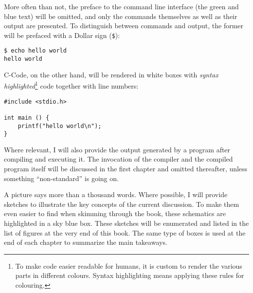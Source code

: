More often than not, the preface to the command line interface (the green and blue text) will be omitted, and only the commands themselves as well as their output are presented. To distinguish between commands and output, the former will be prefaced with a Dollar sign (\texttt{\$}):

\begin{cmdbox}
\texttt{\$ echo hello world} \\
\texttt{hello world}
\end{cmdbox}

C-Code, on the other hand, will be rendered in white boxes with \emph{syntax highlighted}\footnote{To make code easier readable for humans, it is custom to render the various parts in different colours. Syntax highlighting means applying these rules for colouring.} code together with line numbers:
\begin{codebox}[helloworld.c]
\begin{verbatim}
#include <stdio.h>

int main () {
    printf("hello world\n");
}
\end{verbatim}
\end{codebox}

Where relevant, I will also provide the output generated by a program after compiling and executing it. The invocation of the compiler and the compiled program itself will be discussed in the first chapter and omitted thereafter, unless something \enquote{non-standard} is going on.

A picture says more than a thousand words. Where possible, I will provide sketches to illustrate the key concepts of the current discussion. To make them even easier to find when skimming through the book, these schematics are highlighted in a sky blue box. These sketches will be enumerated and listed in the list of figures at the very end of this book. The same type of boxes is used at the end of each chapter to summarize the main takeaways.

\begin{defbox}
\begin{center}
\end{center}
\end{defbox}

